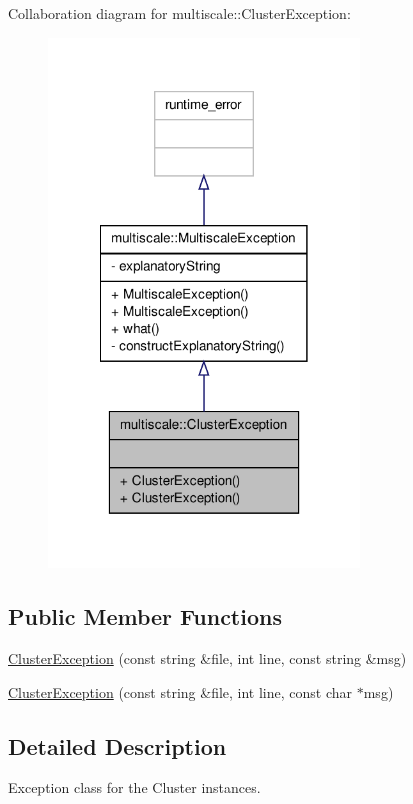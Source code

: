Collaboration diagram for multiscale\-:\-:Cluster\-Exception\-:
\nopagebreak
\begin{figure}[H]
\begin{center}
\leavevmode
\includegraphics[width=234pt]{classmultiscale_1_1ClusterException__coll__graph}
\end{center}
\end{figure}
\subsection*{Public Member Functions}
\begin{DoxyCompactItemize}
\item 
\hyperlink{classmultiscale_1_1ClusterException_a6acb6fc94c9bf4b78a0a3609a931d5d0}{Cluster\-Exception} (const string \&file, int line, const string \&msg)
\item 
\hyperlink{classmultiscale_1_1ClusterException_ab02aae52b2ace112ce68dadc06cfc1b8}{Cluster\-Exception} (const string \&file, int line, const char $\ast$msg)
\end{DoxyCompactItemize}


\subsection{Detailed Description}
Exception class for the Cluster instances. 

